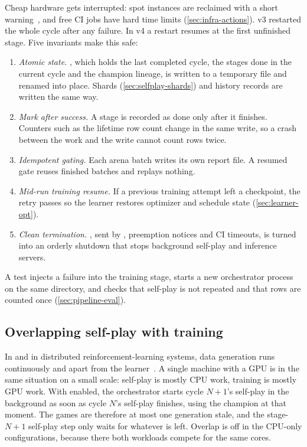 Cheap hardware gets interrupted: spot instances are reclaimed with a short
warning~\citep{awsspot}, and free CI jobs have hard time limits (\cref{sec:infra-actions}).
v3 restarted the whole cycle after any failure. In v4 a restart resumes at the first
unfinished stage. Five invariants make this safe:
\begin{enumerate}
  \item \emph{Atomic state.} , which holds the last completed cycle, the
        stages done in the current cycle and the champion lineage, is written to a
        temporary file and renamed into place. Shards (\cref{sec:selfplay-shards}) and
        history records are written the same way.
  \item \emph{Mark after success.} A stage is recorded as done only after it finishes.
        Counters such as the lifetime row count change in the same write, so a crash
        between the work and the write cannot count rows twice.
  \item \emph{Idempotent gating.} Each arena batch writes its own report file. A resumed
        gate reuses finished batches and replays nothing.
  \item \emph{Mid-run training resume.} If a previous training attempt left a checkpoint,
        the retry passes  so the learner restores optimizer and schedule
        state (\cref{sec:learner-opt}).
  \item \emph{Clean termination.} , sent by , preemption
        notices and CI timeouts, is turned into an orderly shutdown that stops background
        self-play and inference servers.
\end{enumerate}
A test injects a failure into the training stage, starts a new orchestrator process on
the same directory, and checks that self-play is not repeated and that rows are counted
once (\cref{sec:pipeline-eval}).

\subsection{Overlapping self-play with training}
\label{sec:orch-overlap}

In \katago{} and in distributed reinforcement-learning systems, data generation runs
continuously and apart from the learner~\citep{wu2019accelerating,espeholt2018impala,horgan2018distributed}.
A single machine with a GPU is in the same situation on a small scale: self-play is mostly
CPU work, training is mostly GPU work. With  enabled, the
orchestrator starts cycle $N{+}1$'s self-play in the background as soon as cycle $N$'s
self-play finishes, using the champion at that moment. The games are therefore at most one
generation stale, and the stage-$N{+}1$ self-play step only waits for whatever is left.
Overlap is off in the CPU-only configurations, because there both workloads compete for the
same cores.

